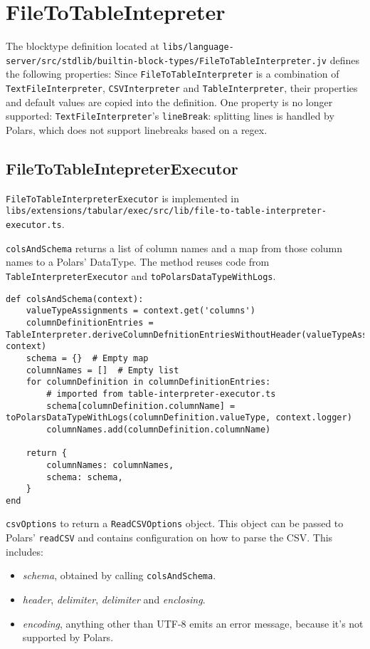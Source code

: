 
\section{FileToTableIntepreter}
The blocktype definition located at \Verb|libs/language-server/src/stdlib/builtin-block-types/FileToTableInterpreter.jv| defines the following properties:
Since \Verb|FileToTableInterpreter| is a combination of \Verb|TextFileInterpreter|, \Verb|CSVInterpreter| and \Verb|TableInterpreter|, their properties and default values are copied into the definition.
One property is no longer supported:
\Verb|TextFileInterpreter|'s \Verb|lineBreak|: splitting lines is handled by Polars, which does not support linebreaks based on a \ac{regex}.

\subsection{FileToTableIntepreterExecutor}
\Verb|FileToTableInterpreterExecutor| is implemented in \Verb|libs/extensions/tabular/exec/src/lib/file-to-table-interpreter-executor.ts|.

\Verb|colsAndSchema| returns a list of column names and a map from those column names to a Polars' DataType.
The method reuses code from \Verb|TableInterpreterExecutor| and \Verb|toPolarsDataTypeWithLogs|.
\begin{listing}
	\begin{verbatim}
def colsAndSchema(context):
	valueTypeAssignments = context.get('columns')
	columnDefinitionEntries = TableInterpreter.deriveColumnDefnitionEntriesWithoutHeader(valueTypeAssignments, context)
	schema = {}  # Empty map
	columnNames = []  # Empty list
	for columnDefinition in columnDefinitionEntries:
		# imported from table-interpreter-executor.ts
		schema[columnDefinition.columnName] = toPolarsDataTypeWithLogs(columnDefinition.valueType, context.logger)
		columnNames.add(columnDefinition.columnName)

	return {
		columnNames: columnNames,
		schema: schema,
	}
end
	\end{verbatim}
\end{listing}

\Verb|csvOptions| to return a \Verb|ReadCSVOptions| object.
This object can be passed to Polars' \Verb|readCSV| and contains configuration on how to parse the \ac{CSV}.
This includes:
\begin{itemize}
	\item \emph{schema}, obtained by calling \Verb|colsAndSchema|.
	\item \emph{header}, \emph{delimiter}, \emph{delimiter} and \emph{enclosing}.
	\item \emph{encoding}, anything other than UTF-8 emits an error message, because it's not supported by Polars.
\end{itemize}

